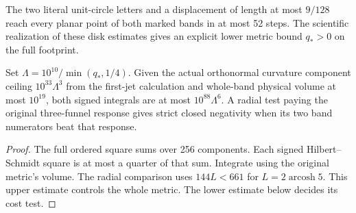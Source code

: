 The two literal unit-circle letters and a displacement of length at most
$9/128$ reach every planar point of both marked bands in at most 52
steps. The scientific realization of these disk estimates gives an
explicit lower metric bound $q_*>0$ on the full footprint.

\begin{proposition}
\label{prop:ed53-full-band}
\leanok
Set $\Lambda=10^{10}/\min(q_*,1/4)$. Given the actual orthonormal
curvature component ceiling $10^{33}\Lambda^3$ from the first-jet
calculation and whole-band physical volume at most $10^{19}$,
both signed integrals are at most $10^{88}\Lambda^6$. A radial
test paying the original three-funnel response gives strict closed
negativity when its two band numerators beat that response.
\end{proposition}
\begin{proof}
\leanok
The full ordered square sums over 256 components. Each signed
Hilbert--Schmidt square is at most a quarter of that sum. Integrate
using the original metric's volume. The radial comparison uses
$144L<661$ for $L=2\operatorname{arcosh}5$.
This upper estimate controls the whole metric. The lower estimate below decides its cost test.
\end{proof}

